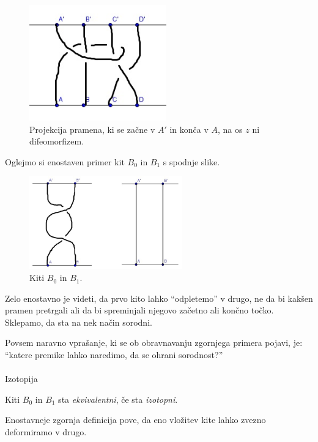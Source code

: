 \documentclass[mat1]{fmfdelo}
\begin{document}
\begin{figure}[ht!]
\includegraphics[height = 5cm]{ne-kita}
\caption{Projekcija pramena, ki se začne v $A'$ in konča v $A$, na os $z$ ni difeomorfizem.}
\end{figure}

\begin{primer}
Oglejmo si enostaven primer kit $B_0$ in $B_1$ s spodnje slike.

\begin{figure}[ht!]
\includegraphics[height = 4cm]{Primer_3}
\caption{Kiti $B_0$ in $B_1$.}
\end{figure}
Zelo enostavno je videti, da prvo kito lahko ``odpletemo'' v drugo, ne da bi kakšen pramen pretrgali ali da bi spreminjali njegovo začetno ali končno točko. Sklepamo, da sta na nek način sorodni.
\end{primer}

Povsem naravno vprašanje, ki se ob obravnavanju zgornjega primera pojavi, je: ``katere premike lahko naredimo, da se ohrani sorodnost?''\\
\\
Izotopija\\

\begin{definicija}
Kiti $B_0$ in $B_1$ sta \emph{ekvivalentni}, če sta \emph{izotopni}.
\end{definicija}

\begin{opomba}
Enostavneje zgornja definicija pove, da eno vložitev kite lahko zvezno deformiramo v drugo.
\end{opomba}
\end{document}
